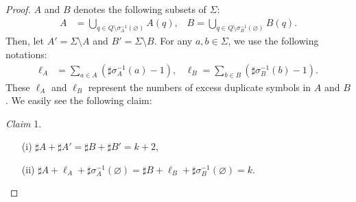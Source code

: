 \begin{proof}
$A$ and $B$ denotes the following subsets of $\Sigma$:
\begin{align*}
  A & = \bigcup_{q \in Q \setminus \sigma_{A}^{-1}(\varnothing)} A(q) \mbox{,~~~}
  B = \bigcup_{q \in Q \setminus \sigma_{B}^{-1}(\varnothing)} B(q).
\end{align*}
Then, let $A' = \Sigma \setminus A$ and $B' = \Sigma \setminus B$.
For any $a,b \in \Sigma$, we use the following notations:
\begin{align*}
  \ell_{A} &= \sum_{a \in A}(\sharp \sigma_{A}^{-1}(a) - 1) \mbox{,~~~}
  \ell_{B} = \sum_{b \in B}(\sharp \sigma_{B}^{-1}(b) - 1).
\end{align*}
These $\ell_{A}$ and $\ell_{B}$ represent the numbers of excess duplicate symbols in $A$ and $B$.
We easily see the following claim:  

\smallskip

\noindent
\textit{Claim} 1. 
\begin{enumerate}
  \item[(i)] $\sharp A + \sharp A' = \sharp B + \sharp B' = k + 2$,
  \item[(ii)] $\sharp A + \ell_{A} + \sharp \sigma_{A}^{-1}(\varnothing) = \sharp B + \ell_{B} + \sharp \sigma_{B}^{-1}(\varnothing) = k$.
\end{enumerate}

\smallskip


\end{proof}
